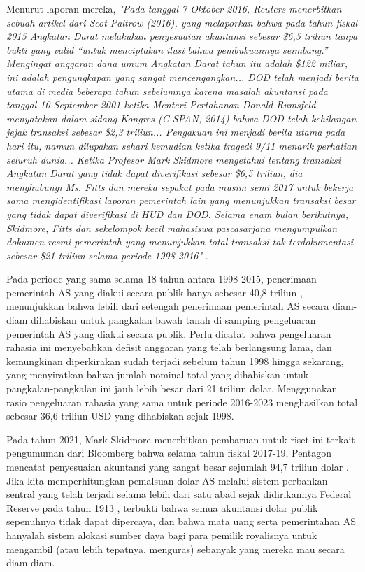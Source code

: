 \documentclass[10pt,twocolumn,letterpaper]{article}
\begin{document}
Menurut laporan mereka, \textit{"Pada tanggal 7 Oktober 2016, Reuters menerbitkan sebuah artikel dari Scot Paltrow (2016), yang melaporkan bahwa pada tahun fiskal 2015 Angkatan Darat melakukan penyesuaian akuntansi sebesar \$6,5 triliun tanpa bukti yang valid “untuk menciptakan ilusi bahwa pembukuannya seimbang.” Mengingat anggaran dana umum Angkatan Darat tahun itu adalah \$122 miliar, ini adalah pengungkapan yang sangat mencengangkan... DOD telah menjadi berita utama di media beberapa tahun sebelumnya karena masalah akuntansi pada tanggal 10 September 2001 ketika Menteri Pertahanan Donald Rumsfeld menyatakan dalam sidang Kongres (C-SPAN, 2014) bahwa DOD telah kehilangan jejak transaksi sebesar \$2,3 triliun... Pengakuan ini menjadi berita utama pada hari itu, namun dilupakan sehari kemudian ketika tragedi 9/11 menarik perhatian seluruh dunia... Ketika Profesor Mark Skidmore mengetahui tentang transaksi Angkatan Darat yang tidak dapat diverifikasi sebesar \$6,5 triliun, dia menghubungi Ms. Fitts dan mereka sepakat pada musim semi 2017 untuk bekerja sama mengidentifikasi laporan pemerintah lain yang menunjukkan transaksi besar yang tidak dapat diverifikasi di HUD dan DOD. Selama enam bulan berikutnya, Skidmore, Fitts dan sekelompok kecil mahasiswa pascasarjana mengumpulkan dokumen resmi pemerintah yang menunjukkan total transaksi tak terdokumentasi sebesar \$21 triliun selama periode 1998-2016"} \cite{12}.

Pada periode yang sama selama 18 tahun antara 1998-2015, penerimaan pemerintah AS yang diakui secara publik hanya sebesar 40,8 triliun \cite{15}, menunjukkan bahwa lebih dari setengah penerimaan pemerintah AS secara diam-diam dihabiskan untuk pangkalan bawah tanah di samping pengeluaran pemerintah AS yang diakui secara publik. Perlu dicatat bahwa pengeluaran rahasia ini menyebabkan defisit anggaran yang telah berlangsung lama, dan kemungkinan diperkirakan sudah terjadi sebelum tahun 1998 hingga sekarang, yang menyiratkan bahwa jumlah nominal total yang dihabiskan untuk pangkalan-pangkalan ini jauh lebih besar dari 21 triliun dolar. Menggunakan rasio pengeluaran rahasia yang sama untuk periode 2016-2023 menghasilkan total sebesar 36,6 triliun USD yang dihabiskan sejak 1998.

Pada tahun 2021, Mark Skidmore menerbitkan pembaruan untuk riset ini terkait pengumuman dari Bloomberg bahwa selama tahun fiskal 2017-19, Pentagon mencatat penyesuaian akuntansi yang sangat besar sejumlah 94,7 triliun dolar \cite{17,18}. Jika kita memperhitungkan pemalsuan dolar AS melalui sistem perbankan sentral yang telah terjadi selama lebih dari satu abad sejak didirikannya Federal Reserve pada tahun 1913 \cite{37}, terbukti bahwa semua akuntansi dolar publik sepenuhnya tidak dapat dipercaya, dan bahwa mata uang serta pemerintahan AS hanyalah sistem alokasi sumber daya bagi para pemilik royalisnya untuk mengambil (atau lebih tepatnya, menguras) sebanyak yang mereka mau secara diam-diam.
\end{document}
